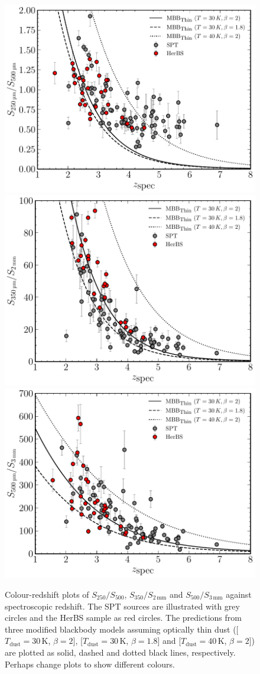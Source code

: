 \begin{figure}
    \centering
    \includegraphics[width=0.55\columnwidth,height=0.29\textheight]{Figures/spt_herbs_colour_250_500.pdf}
    \includegraphics[width=0.55\columnwidth,height=0.29\textheight]{Figures/spt_herbs_colour_350_2000.pdf}
    \includegraphics[width=0.55\columnwidth,height=0.29\textheight]{Figures/spt_herbs_colour_500_3000.pdf}
    \caption[Colours of HerBS and SPT sources as a function of redshift]{Colour-redshift plots of $S_{250}/S_{500}$, $S_{350}/S_{2\,\textrm{mm}}$ and $S_{500}/S_{3\,\textrm{mm}}$ against spectroscopic redshift. The SPT sources are illustrated with grey circles and the HerBS sample as red circles. The predictions from three modified blackbody models assuming optically thin dust ([$T_{\textrm{dust}} = 30\,$K, $\beta = 2$], [$T_{\textrm{dust}} = 30\,$K, $\beta = 1.8$] and [$T_{\textrm{dust}} = 40\,$K, $\beta = 2$]) are plotted as solid, dashed and dotted black lines, respectively. {\color{red}Perhaps change plots to show different colours.}}
    \label{fig:spt_herbs_colour_redshift}
\end{figure}


